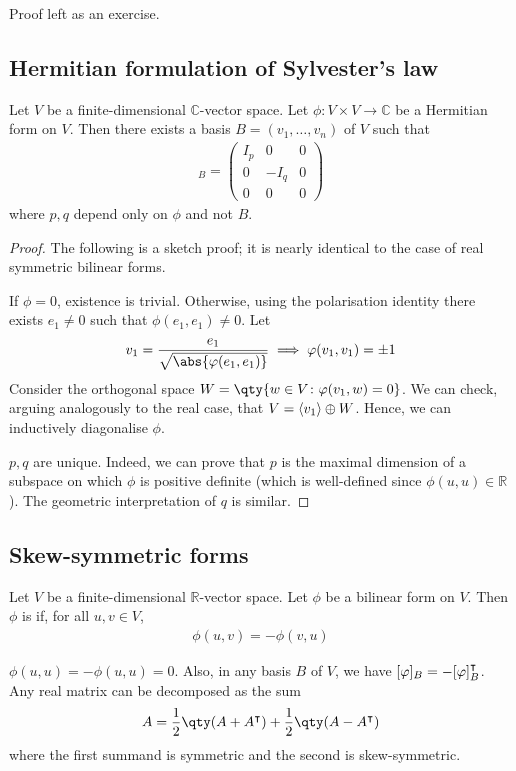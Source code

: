 Proof left as an exercise.

\subsection{Hermitian formulation of Sylvester's law}
\begin{theorem}
	Let $V$ be a finite-dimensional $\mathbb C$-vector space.
	Let $\phi \colon V \times V \to \mathbb C$ be a Hermitian form on $V$.
	Then there exists a basis $B = (v_1, \dots, v_n)$ of $V$ such that
	\begin{align*}
		[\phi]_B = \begin{pmatrix}
			I_p & 0    & 0 \\
			0   & -I_q & 0 \\
			0   & 0    & 0
		\end{pmatrix}
	\end{align*}
	where $p, q$ depend only on $\phi$ and not $B$.
\end{theorem}
\begin{proof}
	The following is a sketch proof; it is nearly identical to the case of real symmetric bilinear forms.

	If $\phi = 0$, existence is trivial.
	Otherwise, using the polarisation identity there exists $e_1 \neq 0$ such that $\phi(e_1, e_1) \neq 0$.
	Let
	\begin{align*}
		v_1 = \frac{e_1}{\sqrt{\abs{\phi(e_1, e_1)}}} \implies \phi(v_1, v_1) = \pm 1
	\end{align*}
	Consider the orthogonal space $W = \qty{w \in V \colon \phi(v_1, w) = 0}$.
	We can check, arguing analogously to the real case, that $V = \langle{} v_1 \rangle \oplus W$.
	Hence, we can inductively diagonalise $\phi$.

	$p, q$ are unique.
	Indeed, we can prove that $p$ is the maximal dimension of a subspace on which $\phi$ is positive definite (which is well-defined since $\phi(u,u) \in \mathbb R$).
	The geometric interpretation of $q$ is similar.
\end{proof}

\subsection{Skew-symmetric forms}
\begin{definition}
	Let $V$ be a finite-dimensional $\mathbb R$-vector space.
	Let $\phi$ be a bilinear form on $V$.
	Then $\phi$ is  if, for all $u,v \in V$,
	\begin{align*}
		\phi(u,v) = -\phi(v,u)
	\end{align*}
\end{definition}
\begin{remark}
	$\phi(u,u) = -\phi(u,u) = 0$.
	Also, in any basis $B$ of $V$, we have $[\varphi]_B = -[\varphi]_B^\intercal$.
	Any real matrix can be decomposed as the sum
	\begin{align*}
		A = \frac{1}{2}\qty(A + A^\transpose) + \frac{1}{2}\qty(A - A^\transpose)
	\end{align*}
	where the first summand is symmetric and the second is skew-symmetric.
\end{remark}

